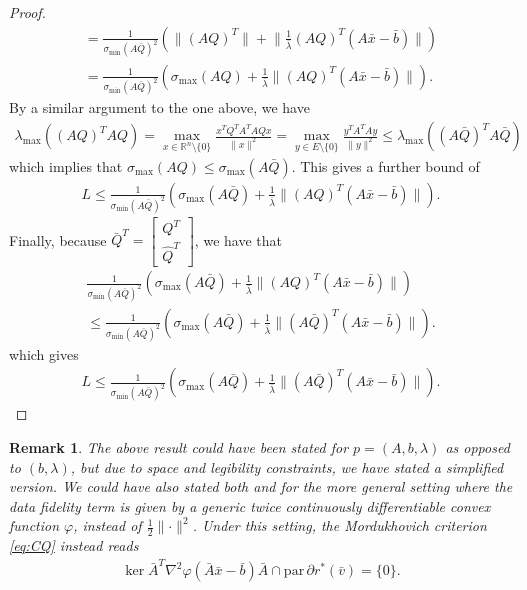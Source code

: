 \documentclass[reqno]{amsart}
\newtheorem{remark}[proposition]{Remark}
\numberwithin{equation}{section}
\newcommand{\R}{\mathbb{R}}
\newcommand{\x}{\bar{x}}
\newcommand{\para}{\mathrm{par}\,}
\begin{document}
\begin{proof}
\begin{align*}
    = \frac{1}{\sigma_{\min}(A \bar Q)^2} \left( \lVert (AQ)^T \rVert + \lVert \frac{1}{\bar \lambda} (AQ)^T (A \x - \bar{b}) \rVert \right) \\
    = \frac{1}{\sigma_{\min}(A \bar Q)^2} \left( \sigma_{\max}(AQ) + \frac{1}{\bar \lambda} \lVert (AQ)^T (A \x - \bar{b}) \rVert \right) .
\end{align*} By a similar argument to the one above, we have \begin{align*}
    \lambda_{\max}((AQ)^T AQ) = \max_{x \in \R^n \setminus \{0\}} \frac{x^TQ^TA^TAQx}{\lVert x \rVert^2}
    = \max_{y \in E \setminus \{0\}} \frac{y^TA^TAy}{\lVert y \rVert^2}
    \le \lambda_{\max}((A \bar Q)^T A \bar Q)
\end{align*} which implies that $\sigma_{\max}(AQ) \le \sigma_{\max}(A \bar Q)$.
This gives a further bound of \begin{align*}
    L \le \frac{1}{\sigma_{\min}(A \bar Q)^2} \left( \sigma_{\max}(A \bar Q) + \frac{1}{\bar \lambda} \lVert (AQ)^T (A \x - \bar{b}) \rVert \right) .
\end{align*} Finally, because $\bar Q^T = \begin{bmatrix}
    Q^T \\
    \hat{Q}^T
\end{bmatrix}$, we have that \begin{align*}
    \frac{1}{\sigma_{\min}(A \bar Q)^2} \left( \sigma_{\max}(A \bar Q) + \frac{1}{\bar \lambda} \lVert (AQ)^T (A \x - \bar{b}) \rVert \right) \\ \le
    \frac{1}{\sigma_{\min}(A \bar Q)^2} \left( \sigma_{\max}(A \bar Q) + \frac{1}{\bar \lambda} \lVert (A \bar Q)^T (A \x - \bar{b}) \rVert \right).
\end{align*} which gives \begin{align*}
    L \le     \frac{1}{\sigma_{\min}(A \bar Q)^2} \left( \sigma_{\max}(A \bar Q) + \frac{1}{\bar \lambda} \lVert (A \bar Q)^T (A \x - \bar{b}) \rVert \right).
\end{align*}
\end{proof}

\begin{remark}
The above result could have been stated for $p = (A, b, \lambda)$ as opposed to $(b, \lambda)$, but due to space and legibility constraints, we have stated a simplified version. We could have also stated both  and  for the more general setting where the data fidelity term is given by a generic twice continuously differentiable convex function $\varphi$, instead of $\frac{1}{2} \lVert \cdot \rVert^2$. Under this setting, the Mordukhovich criterion \eqref{eq:CQ} instead reads \begin{align*}
    \ker \bar{A}^T \nabla^2 \varphi(\bar A \bar x - \bar b) \bar{A} \cap \para \partial r^*(\bar v) = \{0\}.
\end{align*}
\end{remark}
\end{document}
